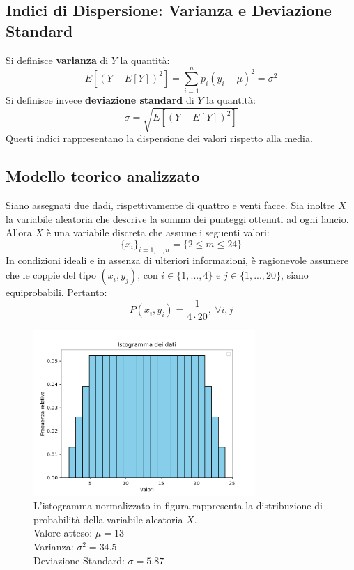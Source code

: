 \subsection{Indici di Dispersione: Varianza e Deviazione Standard}
Si definisce \textbf{varianza} di $Y$ la quantità:
\begin{equation}
    E[(Y-E[Y])^2]= \sum_{i=1}^{n}p_i(y_i - \mu)^2 = \sigma^2
\end{equation}
Si definisce invece \textbf{deviazione standard} di $Y$ la quantità:
\begin{equation}
    \sigma = \sqrt{E[(Y-E[Y])^2]}
\end{equation}
Questi indici rappresentano la dispersione dei valori rispetto alla media.

\subsection{Modello teorico analizzato}
Siano assegnati due dadi, rispettivamente di quattro e venti facce. Sia inoltre $X$ la variabile aleatoria che descrive la somma dei punteggi ottenuti ad ogni lancio. Allora $X$ è una variabile discreta che assume i seguenti valori:
\begin{equation}
	\{x_i\}_{i=1,...,n} = \{2 \leq m \leq 24\}
\end{equation}
In condizioni ideali e in assenza di ulteriori informazioni, è ragionevole assumere che le coppie del tipo $(x_i, y_j)$, con $i \in \{1,...,4\}$ e $j \in \{1,...,20\}$, siano equiprobabili. Pertanto:
\begin{equation}
	P(x_i, y_i) = \frac{1}{4 \cdot 20},\ \forall i, j
\end{equation}
\begin{figure}[H]
	\centering
	\includegraphics[width=0.75\textwidth]{istogramma1.pdf}
	\caption{L'istogramma normalizzato in figura rappresenta la distribuzione di probabilità della variabile aleatoria $X$. \\
	Valore atteso: $\mu=13$ \\
	Varianza: $\sigma^2=34.5$ \\
	Deviazione Standard: $\sigma=5.87$}
\end{figure}

